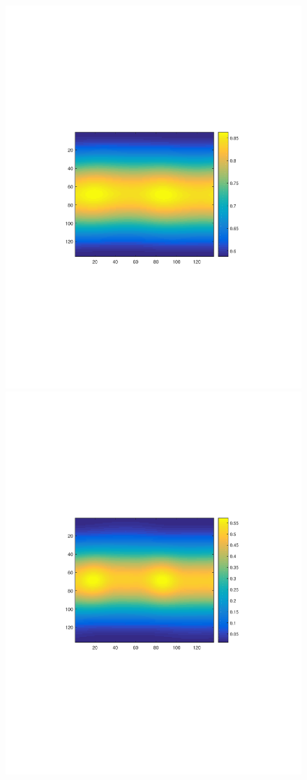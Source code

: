 \documentclass{UCF_ETD}
\begin{document}
 
\begin{figure}[H] 
\begin{center}
\includegraphics[scale=0.41]{RobustRegistration/SphericalImage1}
\includegraphics[scale=0.41]{RobustRegistration/SphericalImage2}

\end{center}
\end{figure}
\end{document}
